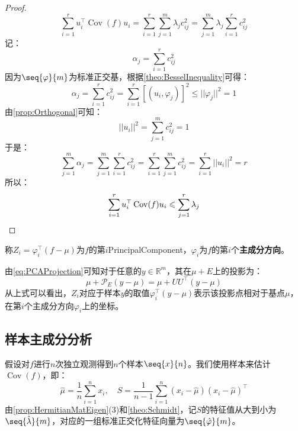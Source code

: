 \begin{proof}
\begin{equation*}
		\sum_{i=1}^{r}u_i^{\top}\operatorname{Cov}(f)u_i=\sum_{i=1}^{r}\sum_{j=1}^{m}\lambda_jc_{ij}^2=\sum_{j=1}^{m}\lambda_j\sum_{i=1}^{r}c_{ij}^2
	\end{equation*}
	记：
	\begin{equation*}
		\alpha_j=\sum_{i=1}^{r}c_{ij}^2
	\end{equation*}
	因为$\seq{\varphi}{m}$为标准正交基，根据\cref{theo:BesselInequality}可得：
	\begin{equation*}
		\alpha_j=\sum_{i=1}^{r}c_{ij}^2=\sum_{i=1}^{r}[(u_i,\varphi_j)]^2\leqslant||\varphi_j||^2=1
	\end{equation*}
	由\cref{prop:Orthogonal}可知：
	\begin{equation*}
		||u_i||^2=\sum_{j=1}^{m}c_{ij}^2=1
	\end{equation*}
	于是：
	\begin{equation*}
		\sum_{j=1}^{m}\alpha_j=\sum_{j=1}^{m}\sum_{i=1}^{r}c_{ij}^2=\sum_{i=1}^{r}\sum_{j=1}^{m}c_{ij}^2=\sum_{i=1}^{r}||u_i||^2=r
	\end{equation*}
	所以：
	\begin{equation*}
		\sum_{i=1}^{r}u_i^{\top}\operatorname{Cov}(f)u_i\leqslant\sum_{j=1}^{r}\lambda_j\qedhere
	\end{equation*}
\end{proof}
\begin{definition}
	称$Z_i=\varphi_i^{\top}(f-\mu)$为$f$的第$i$\gls{PrincipalComponent}，$\varphi_i$为$f$的第$i$个\textbf{主成分方向}。
\end{definition}
\begin{note}
	由\cref{eq:PCAProjection}可知对于任意的$y\in\mathbb{R}^{m}$，其在$\mu+E$上的投影为：
	\begin{equation*}
		\mu+\mathcal{P}_E(y-\mu)=\mu+UU^{\top}(y-\mu)
	\end{equation*}
	从上式可以看出，$Z_i$对应于样本$y$的取值$\varphi_i^{\top}(y-\mu)$表示该投影点相对于基点$\mu$，在第$i$个主成分方向$\varphi_i$上的坐标。
\end{note}

\subsection{样本主成分分析}
假设对$f$进行$n$次独立观测得到$n$个样本$\seq{x}{n}$。我们使用样本来估计$\operatorname{Cov}(f)$，即：
\begin{equation*}
	\hat{\mu}=\frac{1}{n}\sum_{i=1}^{n}x_i,\quad S=\frac{1}{n-1}\sum_{i=1}^{n}(x_i-\hat{\mu})(x_i-\hat{\mu})^{\top}
\end{equation*}
由\cref{prop:HermitianMatEigen}(3)和\cref{theo:Schmidt}，记$S$的特征值从大到小为$\seq{\hat{\lambda}}{m}$，对应的一组标准正交化特征向量为$\seq{\hat{\varphi}}{m}$。\par
